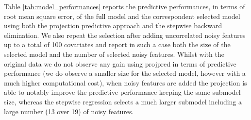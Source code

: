 \documentclass[american,]{article}
\theoremstyle{definition}
\begin{document}

Table \ref{tab:model_performances} reports the predictive performances, in terms of root mean square error, of the full model and the correspondent selected model using both the projection predictive approach and the stepwise backward elimination. We also repeat the selection after adding uncorrelated noisy features up to a total of 100 covariates and report in such a case both the size of the selected model and the number of selected noisy features. Whilst with the original data we do not observe any gain using projpred in terms of predictive performance (we do observe a smaller size for the selected model, however with a much higher computational cost), when noisy features are added the projection is able to notably improve the predictive performance keeping the same submodel size, whereas the stepwise regression selects a much larger submodel including a large number (13 over 19) of noisy features.
\end{document}
